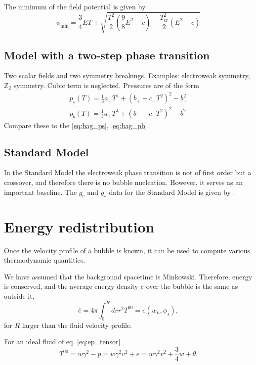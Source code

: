 The minimum of the field potential is given by
\cite[eq. 46]{giese_2020}
\begin{equation}
\phi_\text{min} = \frac{3}{4} ET + \sqrt{\frac{T^2}{2}(\frac{9}{8}E^2 - c) - \frac{T_\text{cr}^2}{2} (E^2 - c)}
\end{equation}


\subsection{Model with a two-step phase transition}
Two scalar fields and two symmetry breakings. Examples: electroweak symmetry, $\mathbb{Z}_2$ symmetry.
Cubic term is neglected.
Pressures are of the form
\cite[eq. 47-48]{giese_2020}
\begin{align}
p_s(T) = \frac{1}{3}a_+ T^4 + (b_+ - c_+ T^2)^2 - b_-^2 \\
p_b(T) = \frac{1}{3}a_+ T^4 + (b_- - c_-T^2)^2 - b_-^2
\end{align}
Compare these to the \eqref{eq:bag_ps}, \eqref{eq:bag_pb}.


\subsection{Standard Model}
In the Standard Model the electroweak phase transition is not of first order but a crossover,
and therefore there is no bubble nucleation.
However, it serves as an important baseline.
The $g_e$ and $g_s$ data for the Standard Model is given by \cite{borsanyi_lattice_2016}.


\section{Energy redistribution}
Once the velocity profile of a bubble is known, it can be used to compute various thermodynamic quantities.

We have assumed that the background spacetime is Minkowski.
Therefore, energy is conserved, and the average energy density $\bar{e}$ over the bubble is the same as outside it,
\begin{equation}
\bar{e} = 4 \pi \int_0^R dr r^2 T^{00} = e(w_n, \phi_s),
\label{eq:e_conservation}
\end{equation}
for $R$ larger than the fluid velocity profile.

For an ideal fluid of eq. \eqref{eq:ep_tensor}
\begin{equation}
T^{00} = w\gamma^2 - p = w\gamma^2 v^2 + e = w\gamma^2 v^2 + \frac{3}{4}w + \theta.
\end{equation}

